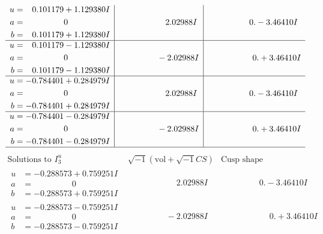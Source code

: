 \documentclass[1p]{elsarticle_modified}
\theoremstyle{definition}
\newcommand{\I}{\sqrt{-1}}
\begin{document}
$$\begin{array}{c|c|c}
\begin{aligned}
u &= \phantom{-}0.101179 + 1.129380 I \\
a &= \phantom{-0.000000 } 0 \\
b &= \phantom{-}0.101179 + 1.129380 I\end{aligned}
 & \phantom{-0.000000 -}2.02988 I & \phantom{-0.000000 } 0. - 3.46410 I \\ \hline\begin{aligned}
u &= \phantom{-}0.101179 - 1.129380 I \\
a &= \phantom{-0.000000 } 0 \\
b &= \phantom{-}0.101179 - 1.129380 I\end{aligned}
 & \phantom{-0.000000 } -2.02988 I & \phantom{-0.000000 -}0. + 3.46410 I \\ \hline\begin{aligned}
u &= -0.784401 + 0.284979 I \\
a &= \phantom{-0.000000 } 0 \\
b &= -0.784401 + 0.284979 I\end{aligned}
 & \phantom{-0.000000 -}2.02988 I & \phantom{-0.000000 } 0. - 3.46410 I \\ \hline\begin{aligned}
u &= -0.784401 - 0.284979 I \\
a &= \phantom{-0.000000 } 0 \\
b &= -0.784401 - 0.284979 I\end{aligned}
 & \phantom{-0.000000 } -2.02988 I & \phantom{-0.000000 -}0. + 3.46410 I\\
 \hline 
 \end{array}$$\newpage$$\begin{array}{c|c|c}  
\text{Solutions to }I^u_{3}& \I (\text{vol} + \sqrt{-1}CS) & \text{Cusp shape}\\
 \hline 
\begin{aligned}
u &= -0.288573 + 0.759251 I \\
a &= \phantom{-0.000000 } 0 \\
b &= -0.288573 + 0.759251 I\end{aligned}
 & \phantom{-0.000000 -}2.02988 I & \phantom{-0.000000 } 0. - 3.46410 I \\ \hline\begin{aligned}
u &= -0.288573 - 0.759251 I \\
a &= \phantom{-0.000000 } 0 \\
b &= -0.288573 - 0.759251 I\end{aligned}
 & \phantom{-0.000000 } -2.02988 I & \phantom{-0.000000 -}0. + 3.46410 I \\ \hline\begin{aligned}

\end{aligned}
\end{array}$$
\end{document}
